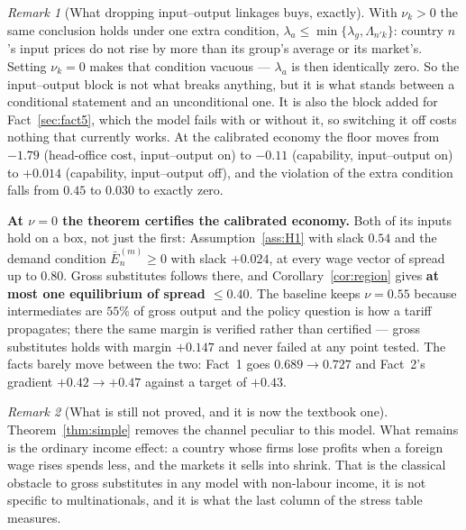 \documentclass[11pt]{article}
\theoremstyle{plain}
\theoremstyle{remark}
\newtheorem{remark}{Remark}
\theoremstyle{definition}
\begin{document}
\begin{remark}[What dropping input--output linkages buys, exactly]
With $\nu_k>0$ the same conclusion holds under one extra condition,
$\lambda_a\le\min\{\lambda_g,\Lambda_{n'k}\}$: country $n$'s input prices do not rise by
more than its group's average or its market's. Setting $\nu_k=0$ makes that condition
vacuous --- $\lambda_a$ is then identically zero. So the input--output block is not
what breaks anything, but it is what stands between a conditional statement and an
unconditional one. It is also the block added for Fact~\ref{sec:fact5}, which the model
fails with or without it, so switching it off costs nothing that currently works.
At the calibrated economy the floor moves from $-1.79$ (head-office cost,
input--output on) to $-0.11$ (capability, input--output on) to $+0.014$
(capability, input--output off), and the violation of the extra condition falls
from $0.45$ to $0.030$ to exactly zero.

\textbf{At $\nu=0$ the theorem certifies the calibrated economy.} Both of its inputs
hold on a box, not just the first: Assumption~\ref{ass:H1} with slack $0.54$ and the
demand condition $\bar E^{(m)}_n\ge0$ with slack $+0.024$, at every wage vector of spread
up to $0.80$. Gross substitutes follows there, and Corollary~\ref{cor:region} gives
\textbf{at most one equilibrium of spread $\le0.40$}. The baseline keeps $\nu=0.55$
because intermediates are $55$\% of gross output and the policy question is how a tariff
propagates; there the same margin is verified rather than certified --- gross substitutes
holds with margin $+0.147$ and never failed at any point tested. The facts barely move
between the two: Fact~1 goes $0.689\to0.727$ and Fact~2's gradient $+0.42\to+0.47$
against a target of $+0.43$.
\end{remark}

\begin{remark}[What is still not proved, and it is now the textbook one]
Theorem~\ref{thm:simple} removes the channel peculiar to this model. What remains is the
ordinary income effect: a country whose firms lose profits when a foreign wage rises
spends less, and the markets it sells into shrink. That is the classical obstacle to
gross substitutes in any model with non-labour income, it is not specific to
multinationals, and it is what the last column of the stress table measures.
\end{remark}
\end{document}
